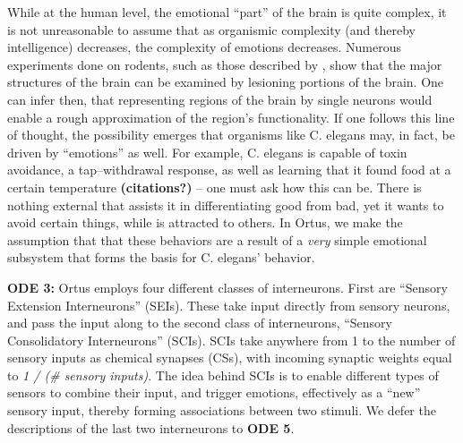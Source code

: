 \documentclass[letterpaper]{article}
\begin{document}
While at the human level, the emotional ``part'' of the brain is quite complex, it is not unreasonable to assume that as organismic complexity (and thereby intelligence) decreases, the complexity of emotions decreases. Numerous experiments done on rodents, such as those described by \citet{Weiner2015}, show that the major structures of the brain can be examined by lesioning portions of the brain. One can infer then, that representing regions of the brain by single neurons would enable a rough approximation of the region's functionality. If one follows this line of thought, the possibility emerges that organisms like C. elegans may, in fact, be driven by ``emotions'' as well. For example, C. elegans is capable of toxin avoidance, a tap--withdrawal response, as well as learning that it found food at a certain temperature \textbf{(citations?)} -- one must ask how this can be. There is nothing external that assists it in differentiating good from bad, yet it wants to avoid certain things, while is attracted to others. In Ortus, we make the assumption that that these behaviors are a result of a \textit{very} simple emotional subsystem that forms the basis for C. elegans' behavior.


\textbf{ODE 3:} Ortus employs four different classes of interneurons. First are ``Sensory Extension Interneurons'' (SEIs). These take input directly from sensory neurons, and pass the input along to the second class of interneurons, ``Sensory Consolidatory Interneurons'' (SCIs).
SCIs take anywhere from 1 to the number of sensory inputs as chemical synapses (CSs), with incoming synaptic weights equal to \textit{1 / (\# sensory inputs)}.
The idea behind SCIs is to enable different types of sensors to combine their input, and trigger emotions, effectively as a ``new'' sensory input, thereby forming associations between two stimuli. We defer the descriptions of the last two interneurons to \textbf{ODE 5}.
\end{document}
